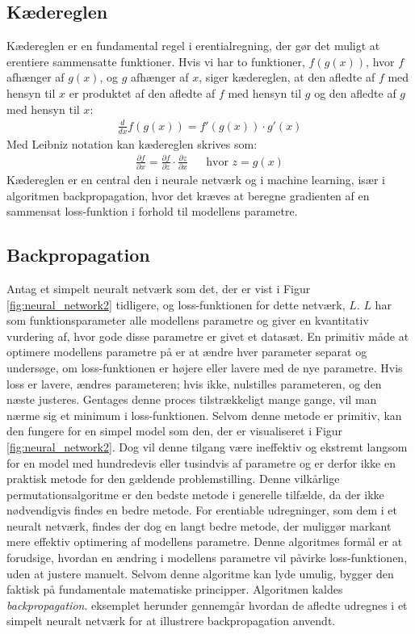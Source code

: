 \documentclass{article}
\newcommand{\figureref}[1]{Figur \ref{#1}}
\begin{document}
\subsection{Kædereglen}
Kædereglen er en fundamental regel i erentialregning, der gør det muligt at erentiere sammensatte funktioner. Hvis vi har to funktioner, $f(g(x))$, hvor $f$ afhænger af $g(x)$, og $g$ afhænger af $x$, siger kædereglen, at den afledte af $f$ med hensyn til $x$ er produktet af den afledte af $f$ med hensyn til $g$ og den afledte af $g$ med hensyn til $x$:
\begin{align}
  \frac{d}{dx} f(g(x)) = f'(g(x)) \cdot g'(x)
\end{align}
Med Leibniz notation kan kædereglen skrives som:
\begin{align}
  \frac{\partial f}{\partial x} = \frac{\partial f}{\partial z} \cdot \frac{\partial z}{\partial x}
  &&
  \text{hvor } z = g(x)
\end{align}
Kædereglen er en central den i neurale netværk og i machine learning, især i algoritmen backpropagation, hvor det kræves at beregne gradienten af en sammensat loss-funktion i forhold til modellens parametre. \parencite{Kirsanov_2024}
\subsection{Backpropagation}
Antag et simpelt neuralt netværk som det, der er vist i \figureref{fig:neural_network2} tidligere, og loss-funktionen for dette netværk, $L$. $L$ har som funktionsparameter alle modellens parametre og giver en kvantitativ vurdering af, hvor gode disse parametre er givet et datasæt. En primitiv måde at optimere modellens parametre på er at ændre hver parameter separat og undersøge, om loss-funktionen er højere eller lavere med de nye parametre. Hvis loss er lavere, ændres parameteren; hvis ikke, nulstilles parameteren, og den næste justeres. Gentages denne proces tilstrækkeligt mange gange, vil man nærme sig et minimum i loss-funktionen. Selvom denne metode er primitiv, kan den fungere for en simpel model som den, der er visualiseret i \figureref{fig:neural_network2}. Dog vil denne tilgang være ineffektiv og ekstremt langsom for en model med hundredevis eller tusindvis af parametre og er derfor ikke en praktisk metode for den gældende problemstilling. Denne vilkårlige permutationsalgoritme er den bedste metode i generelle tilfælde, da der ikke nødvendigvis findes en bedre metode. \parencite{Kirsanov_2024} For erentiable udregninger, som dem i et neuralt netværk, findes der dog en langt bedre metode, der muliggør markant mere effektiv optimering af modellens parametre. Denne algoritmes formål er at forudsige, hvordan en ændring i modellens parametre vil påvirke loss-funktionen, uden at justere manuelt. Selvom denne algoritme kan lyde umulig, bygger den faktisk på fundamentale matematiske principper. Algoritmen kaldes \textit{backpropagation}. \parencite{Kirsanov_2024, Nielsen_2019b, Sanderson_2017} eksemplet herunder gennemgår hvordan de afledte udregnes i et simpelt neuralt netværk for at illustrere backpropagation anvendt.
\end{document}

